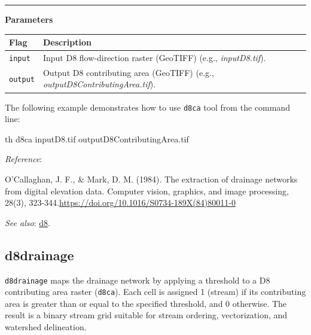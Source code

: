 \documentclass[
]{book}
\newenvironment{Shaded}{\begin{snugshade}}{\end{snugshade}}
\newcommand{\ExtensionTok}[1]{#1}
\newcommand{\NormalTok}[1]{#1}
\begin{document}
\begin{center}\rule{0.5\linewidth}{0.5pt}\end{center}

\textbf{Parameters}

\begin{longtable}[]{@{}
  >{\raggedright\arraybackslash}p{}
  >{\raggedright\arraybackslash}p{}@{}}
\toprule\noalign{}
\begin{minipage}[b]{\linewidth}\raggedright
Flag
\end{minipage} & \begin{minipage}[b]{\linewidth}\raggedright
Description
\end{minipage} \\
\midrule\noalign{}
\endhead
\bottomrule\noalign{}
\endlastfoot
\texttt{input} & Input D8 flow-direction raster (GeoTIFF) (e.g., \emph{inputD8.tif}). \\
\texttt{output} & Output D8 contributing area (GeoTIFF) (e.g., \emph{outputD8ContributingArea.tif}). \\
\end{longtable}

The following example demonstrates how to use \texttt{d8ca} tool from the command line:

\begin{Shaded}
\begin{Highlighting}[]
\ExtensionTok{th}\NormalTok{ d8ca inputD8.tif outputD8ContributingArea.tif}
\end{Highlighting}
\end{Shaded}

\emph{Reference}:

O'Callaghan, J. F., \& Mark, D. M. (1984). The extraction of drainage networks from digital elevation data. Computer vision, graphics, and image processing, 28(3), 323-344.\url{https://doi.org/10.1016/S0734-189X(84)80011-0}

\emph{See also}: \hyperref[d8]{d8}.

\subsection{d8drainage}\label{d8drainage}

\texttt{d8drainage} maps the drainage network by applying a threshold to a D8 contributing area raster (\texttt{d8ca}). Each cell is assigned 1 (stream) if its contributing area is greater than or equal to the specified threshold, and 0 otherwise. The result is a binary stream grid suitable for stream ordering, vectorization, and watershed delineation.
\end{document}
